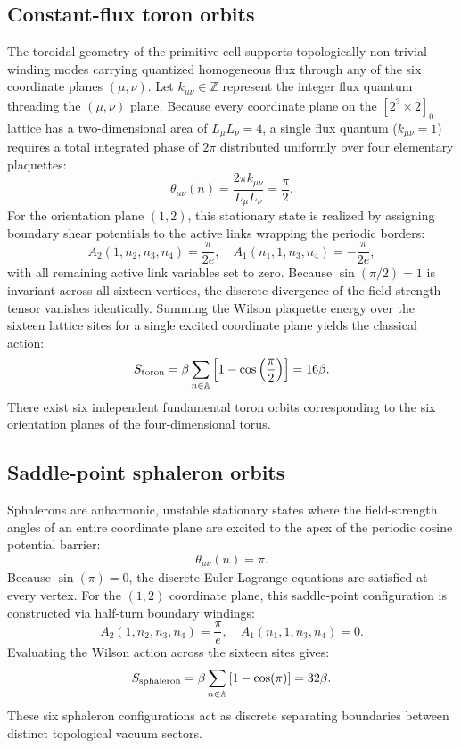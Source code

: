 \documentclass[11pt,a4paper]{article}
\begin{document}
\subsection{Constant-flux toron orbits}
The toroidal geometry of the primitive cell supports topologically non-trivial winding modes carrying quantized homogeneous flux through any of the six coordinate planes $(\mu,\nu)$. Let $k_{\mu\nu} \in \mathbb{Z}$ represent the integer flux quantum threading the $(\mu,\nu)$ plane. Because every coordinate plane on the $[2^3 \times 2]_0$ lattice has a two-dimensional area of $L_\mu L_\nu = 4$, a single flux quantum ($k_{\mu\nu} = 1$) requires a total integrated phase of $2\pi$ distributed uniformly over four elementary plaquettes:
\begin{equation}
\theta_{\mu\nu}(n) = \frac{2\pi k_{\mu\nu}}{L_\mu L_\nu} = \frac{\pi}{2}.
\end{equation}
For the orientation plane $(1,2)$, this stationary state is realized by assigning boundary shear potentials to the active links wrapping the periodic borders:
\begin{equation}
A_2(1, n_2, n_3, n_4) = \frac{\pi}{2 e}, \quad A_1(n_1, 1, n_3, n_4) = -\frac{\pi}{2 e},
\end{equation}
with all remaining active link variables set to zero. Because $\sin(\pi/2) = 1$ is invariant across all sixteen vertices, the discrete divergence of the field-strength tensor vanishes identically. Summing the Wilson plaquette energy over the sixteen lattice sites for a single excited coordinate plane yields the classical action:
\begin{equation}
S_{\text{toron}} = \beta \sum_{n \in \mathbb{A}} \left[ 1 - \cos\left(\frac{\pi}{2}\right) \right] = 16\beta.
\end{equation}
There exist six independent fundamental toron orbits corresponding to the six orientation planes of the four-dimensional torus.

\subsection{Saddle-point sphaleron orbits}
Sphalerons are anharmonic, unstable stationary states where the field-strength angles of an entire coordinate plane are excited to the apex of the periodic cosine potential barrier:
\begin{equation}
\theta_{\mu\nu}(n) = \pi.
\end{equation}
Because $\sin(\pi) = 0$, the discrete Euler-Lagrange equations are satisfied at every vertex. For the $(1,2)$ coordinate plane, this saddle-point configuration is constructed via half-turn boundary windings:
\begin{equation}
A_2(1, n_2, n_3, n_4) = \frac{\pi}{e}, \quad A_1(n_1, 1, n_3, n_4) = 0.
\end{equation}
Evaluating the Wilson action across the sixteen sites gives:
\begin{equation}
S_{\text{sphaleron}} = \beta \sum_{n \in \mathbb{A}} \left[ 1 - \cos(\pi) \right] = 32\beta.
\end{equation}
These six sphaleron configurations act as discrete separating boundaries between distinct topological vacuum sectors.
\end{document}
